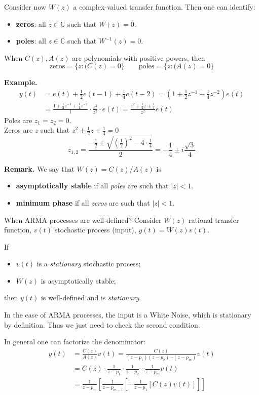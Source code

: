 Consider now $W(z)$ a complex-valued transfer function. Then one can identify:
\begin{itemize}
	\item \textbf{zeros}: all $z\in \mathbb{C}$ such that $W(z)=0$.
	\item \textbf{poles}: all $z\in \mathbb{C}$ such that $W^{-1} (z)=0$.
\end{itemize}
When $C(z),A(z)$ are polynomials with positive powers, then
\[
	\text{zeros}=\{z:(C(z)=0\} \qquad \text{poles}=\{z:(A(z)=0\}
\]

\textbf{Example.}
\begin{align*}
y(t) &=e(t)+\frac{1}{2} e(t-1)+\frac{1}{4} e(t-2) =\left(1+\frac{1}{2} z^{-1}+\frac{1}{4} z^{-2}\right) e(t) \\
&=\frac{1+\frac{1}{2} z^{-1}+\frac{1}{4} z^{-2}}{1} \cdot \frac{z^{2}}{z^{2}}\cdot e(t) =\frac{z^{2}+\frac{1}{2} z+\frac{1}{4}}{z^{2}} e(t)
\end{align*}
Poles are $z_{1}=z_{2}=0$.\\
Zeros are $z$ such that $z^{2}+\frac{1}{2} z+\frac{1}{4}=0$
\[
	z_{1,2}=\frac{-\frac{1}{2} \pm \sqrt{\left( \frac{1}{2}  \right) ^2 -4\cdot\frac{1}{4} } }{2} = -\frac{1}{4}\pm i\frac{\sqrt{3} }{4}
\]

\textbf{Remark.}
We say that $W(z)=C(z)/A(z)$ is
\begin{itemize}
	\item \textbf{asymptotically stable} if all \emph{poles} are such that $|z|<1$.
	\item \textbf{minimum phase} if all \emph{zeros} are such that $|z|<1$.
\end{itemize}

When ARMA processes are well-defined? Consider $W(z)$ rational transfer function, $v(t)$ stochastic process (input), $y(t)=W(z)v(t)$.

\begin{theorem}
	If
	\begin{itemize}
		\item $v(t)$ is a \emph{stationary} stochastic process;
		\item $W(z)$ is asymptotically stable;
	\end{itemize}
	then $y(t)$ is well-defined and is \emph{stationary}.
\end{theorem}

In the case of ARMA processes, the input is a White Noise, which is stationary by definition. Thus we just need to check the second condition.

In general one can factorize the denominator:
\begin{align*}
	y(t)&=\frac{C(z)}{A(z)}v(t)=\frac{C(z)}{(z-p_{1})(z-p_{2})\cdots(z-p_{m})}v(t)\\
	&=C(z)\cdot\frac{1}{z-p_{1}}\cdot\frac{1}{z-p_{2}}\cdots\frac{1}{z-p_{m}}v(t)\\
	&=\frac{1}{z-p_{m}}\left[ \frac{1}{z-p_{m-1}}\left[ \cdots\frac{1}{z-p_{1}}\left[ C(z)v(t) \right]   \right]   \right]  
\end{align*}
